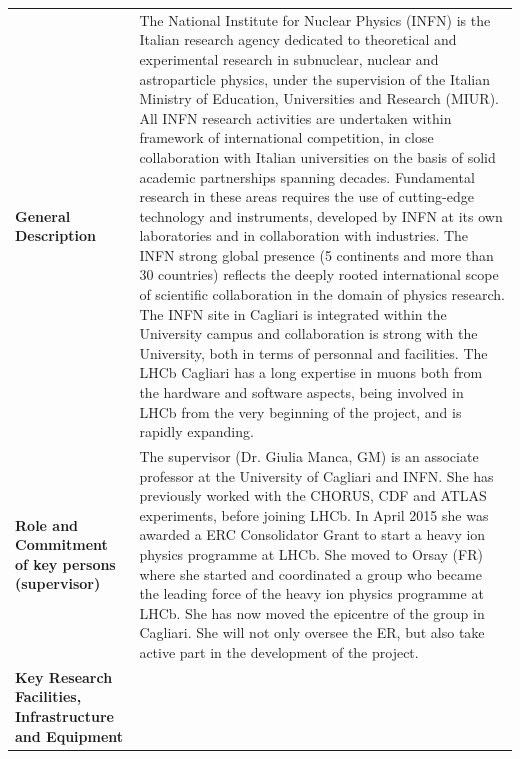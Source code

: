 \documentclass[a4paper,11pt]{article}
\begin{document}
{\footnotesize %
\noindent\begin{tabular}{>{\raggedright}p{}p{}}
  \multicolumn{2}{l}{\textbf{Beneficiary: INFN}} \\\midrule
\textbf{General Description} &
The National Institute for Nuclear Physics (INFN) is the Italian
research agency dedicated to theoretical and experimental research
in subnuclear, nuclear and astroparticle physics, under the
supervision of the Italian Ministry of Education, Universities and
Research (MIUR). All INFN research activities are undertaken within
framework of international competition, in close collaboration with
Italian universities on the basis of solid academic partnerships
spanning decades. Fundamental research in these areas requires the
use of cutting-edge technology and instruments, developed by INFN
at its own laboratories and in collaboration with industries. The INFN
strong global presence (5 continents and more than 30 countries)
reflects the deeply rooted international scope of scientific
collaboration in the domain of physics research. 
The INFN site in Cagliari is integrated within the University 
campus and collaboration is strong with the University, 
both in terms of personnal and facilities.
The LHCb Cagliari has a long expertise in 
muons both from the hardware and software 
aspects, being involved in LHCb from the very beginning 
of the project, and is rapidly expanding.
\\\midrule
\textbf{Role and Commitment of key persons (supervisor)} & %
The supervisor (Dr. Giulia Manca, GM) is an associate professor at the 
University of Cagliari and INFN. 
She has previously worked with the CHORUS, CDF and ATLAS experiments, before joining LHCb.
In April 2015 she
was awarded a ERC Consolidator Grant to start a heavy ion physics 
programme at LHCb. She moved to Orsay (FR) 
where she started and coordinated a group
who became the leading force of the 
heavy ion physics programme at LHCb. 
She has now moved the epicentre of the group in Cagliari. 
She will not only oversee the ER, but also take active part in the development of the project.
\\\midrule
\textbf{Key Research Facilities, Infrastructure and Equipment} &

\end{tabular}}
\end{document}
